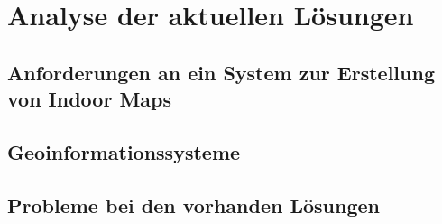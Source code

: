 \chapter{Analyse der aktuellen Lösungen}

\section{Anforderungen an ein System zur Erstellung von Indoor Maps}

\section{Geoinformationssysteme}

\section{Probleme bei den vorhanden Lösungen}
